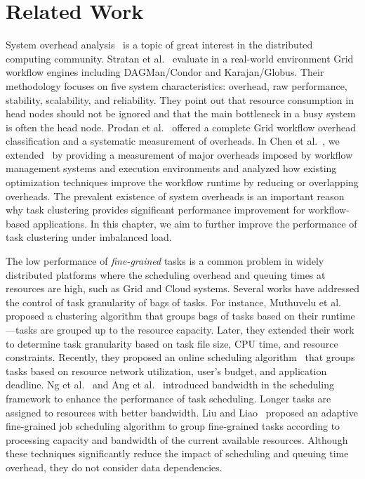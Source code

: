 \section{Related Work}
\label{sec:related-work}

{System }overhead analysis~\cite{Ostberg2011, Prodan2008} is a topic of great interest in the {distributed computing } community. Stratan et al.~\cite{Stratan2008} evaluate in a real-world environment Grid workflow engines including DAGMan/Condor and Karajan/Globus. Their methodology focuses on five system characteristics: overhead, raw performance, stability, scalability, and reliability. They {point } out that {resource consumption in head nodes }should not be {ignored } and {that } the main bottleneck in a busy system is often the head node. Prodan et al.~\cite{Prodan2008} offered a complete Grid workflow overhead classification and a systematic measurement of overheads. In Chen et al.~\cite{Chen2011}, we extended~\cite{Prodan2008} by providing a measurement of major overheads imposed by workflow management systems and execution environments and analyzed how existing optimization techniques improve {the workflow }runtime by reducing or overlapping overheads. The prevalent existence of system overheads is an important reason why task clustering provides significant performance improvement for workflow-based applications. In this chapter, we aim to further improve the performance of task clustering under imbalanced load. 

The low performance of \emph{fine-grained} tasks is a common problem in widely distributed platforms where the scheduling overhead and queuing times at resources are high, such as Grid and Cloud systems. Several works have addressed the control of task granularity of bags of tasks. For instance, Muthuvelu et al.~\cite{Muthuvelu:2005:DJG:1082290.1082297} proposed a clustering algorithm that groups bags of tasks based on their runtime---tasks are grouped up to the resource capacity. Later, they extended their work~\cite{4493929} to determine task granularity based on task file size, CPU time, and resource constraints. Recently, they proposed an online scheduling algorithm~\cite{Muthuvelu2010,Muthuvelu2013170} that groups tasks based on resource network utilization, user's budget, and application deadline. Ng et al.~\cite{keat-2006} and Ang et al.~\cite{ang-2009} introduced bandwidth in the scheduling framework to enhance the performance of task scheduling. Longer tasks are assigned to resources with better bandwidth. Liu and Liao~\cite{Liu2009} proposed an adaptive fine-grained job scheduling algorithm to group fine-grained tasks according to processing capacity and bandwidth of the current available resources. Although these techniques significantly reduce the impact of scheduling and queuing time overhead, they {do } not consider data dependencies.

